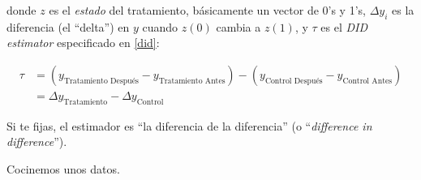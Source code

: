 \documentclass[onesided]{article}\usepackage[]{graphicx}\usepackage[]{color}
\begin{document}
donde $z$ es el \emph{estado} del tratamiento, b\'asicamente un vector de 0's y 1's, $\Delta y_{i}$ es la diferencia (el ``delta'') en $y$ cuando $z(0)$ cambia a $z(1)$, y $\tau$ es el \emph{DID estimator} especificado en \autoref{did}:



\begin{equation} \label{did}
\begin{split}
\tau & = (y_{\text{Tratamiento Despu\'es}}-y_{\text{Tratamiento Antes}}) - (y_{\text{Control Despu\'es}}-y_{\text{Control Antes}})\\
     & = \Delta y_{\text{Tratamiento}} - \Delta y_{\text{Control}}
\end{split}
\end{equation}


Si te fijas, el estimador es ``la diferencia de la diferencia'' (o ``\emph{difference in difference}'').


Cocinemos unos datos.
\end{document}
